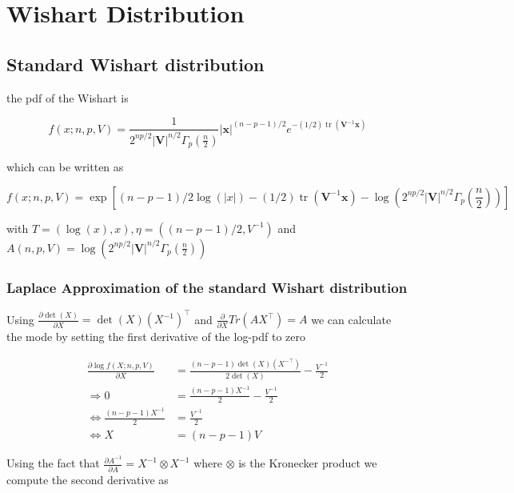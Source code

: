\section{Wishart Distribution}

\subsection{Standard Wishart distribution}

the pdf of the Wishart is

\begin{equation}
	f(x; n,p,V) = \frac{1}{2^{np/2} \left|{\mathbf V}\right|^{n/2} \Gamma_p\left(\frac {n}{2}\right ) }{\left|\mathbf{x}\right|}^{(n-p-1)/2} e^{-(1/2)\operatorname{tr}({\mathbf V}^{-1}\mathbf{x})}
	\label{eq:wishart_pdf}
\end{equation}

which can be written as

\begin{equation}
	f(x; n,p,V) = \exp \left[(n-p-1)/2 \log(|x|) -(1/2)\operatorname{tr}({\mathbf V}^{-1}\mathbf{x}) - \log\left(2^{np/2} \left|{\mathbf V}\right|^{n/2} \Gamma_p\left(\frac {n}{2}\right )\right) \right]
\end{equation}

with $T=(\log(x), x), \eta=((n-p-1)/2, V^{-1})$ and $A(n,p,V)=\log\left(2^{np/2} \left|{\mathbf V}\right|^{n/2} \Gamma_p\left(\frac {n}{2}\right )\right)$

\subsubsection{Laplace Approximation of the standard Wishart distribution}

Using $\frac{\partial \det(X)}{\partial X} = \det(X)(X^{-1})^\top$ and $\frac{\partial}{\partial X} Tr(AX^\top) = A$ we can calculate the mode by setting the first derivative of the log-pdf to zero

\begin{align*}
	\frac{\partial \log f(X; n,p,V)}{\partial X} &= \frac{(n-p-1)\det(X)(X^{-\top})}{2\det(X)} - \frac{V^{-1}}{2} \\
	 \Rightarrow 0 &= \frac{(n-p-1)X^{-1}}{2} - \frac{V^{-1}}{2} \\
	\Leftrightarrow  \frac{(n-p-1)X^{-1}}{2} &= \frac{V^{-1}}{2} \\
	\Leftrightarrow X &= (n-p-1)V
\end{align*}

Using the fact that $\frac{\partial A^{-1}}{\partial A} = X^{-1} \otimes X^{-1}$ where $\otimes$ is the Kronecker product we compute the second derivative as

